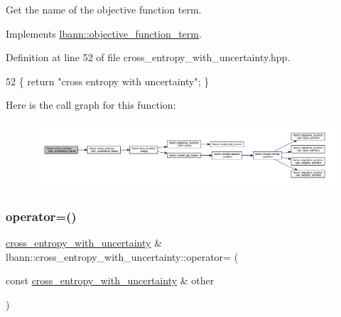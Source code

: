 Get the name of the objective function term. 

Implements \hyperlink{classlbann_1_1objective__function__term_a964fbfad3dd0434aa8f32c5fedf1079a}{lbann\+::objective\+\_\+function\+\_\+term}.



Definition at line 52 of file cross\+\_\+entropy\+\_\+with\+\_\+uncertainty.\+hpp.


\begin{DoxyCode}
52 \{ \textcolor{keywordflow}{return} \textcolor{stringliteral}{"cross entropy with uncertainty"}; \}
\end{DoxyCode}
Here is the call graph for this function\+:\nopagebreak
\begin{figure}[H]
\begin{center}
\leavevmode
\includegraphics[width=350pt]{classlbann_1_1cross__entropy__with__uncertainty_a56d734c6665ac1752d8ef821edf2f464_cgraph}
\end{center}
\end{figure}
\mbox{\label{classlbann_1_1cross__entropy__with__uncertainty_a036433c9c57e030d1923543dc211813a}} 
\subsubsection{\texorpdfstring{operator=()}{operator=()}}
{\footnotesize\ttfamily \hyperlink{classlbann_1_1cross__entropy__with__uncertainty}{cross\+\_\+entropy\+\_\+with\+\_\+uncertainty} \& lbann\+::cross\+\_\+entropy\+\_\+with\+\_\+uncertainty\+::operator= (\begin{DoxyParamCaption}\item[{const \hyperlink{classlbann_1_1cross__entropy__with__uncertainty}{cross\+\_\+entropy\+\_\+with\+\_\+uncertainty} \&}]{other }\end{DoxyParamCaption})}

